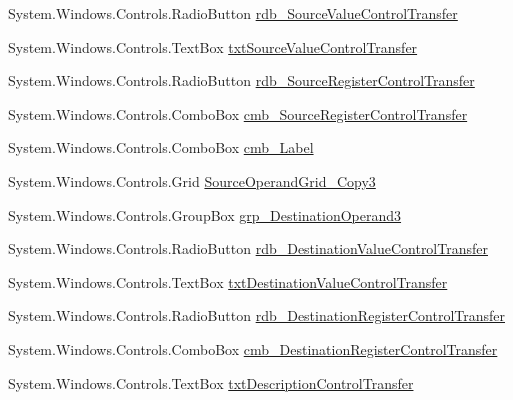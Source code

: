 \begin{DoxyCompactItemize}
\item 
System.\+Windows.\+Controls.\+Radio\+Button \hyperlink{class_c_p_u___o_s___simulator_1_1_instructions_window_a590a2e5af41ea5cf215da3ff7dd1b20b}{rdb\+\_\+\+Source\+Value\+Control\+Transfer}
\item 
System.\+Windows.\+Controls.\+Text\+Box \hyperlink{class_c_p_u___o_s___simulator_1_1_instructions_window_a602831ff353007879c08b22d373a2ba5}{txt\+Source\+Value\+Control\+Transfer}
\item 
System.\+Windows.\+Controls.\+Radio\+Button \hyperlink{class_c_p_u___o_s___simulator_1_1_instructions_window_a63fea6d97a26f4ed71753209dac85d24}{rdb\+\_\+\+Source\+Register\+Control\+Transfer}
\item 
System.\+Windows.\+Controls.\+Combo\+Box \hyperlink{class_c_p_u___o_s___simulator_1_1_instructions_window_a652354e464657693cf70a292b3389626}{cmb\+\_\+\+Source\+Register\+Control\+Transfer}
\item 
System.\+Windows.\+Controls.\+Combo\+Box \hyperlink{class_c_p_u___o_s___simulator_1_1_instructions_window_ab5cb868e415c29cd067309b9cce1efc1}{cmb\+\_\+\+Label}
\item 
System.\+Windows.\+Controls.\+Grid \hyperlink{class_c_p_u___o_s___simulator_1_1_instructions_window_ac37123264ae139f4abc30841da21cd23}{Source\+Operand\+Grid\+\_\+\+Copy3}
\item 
System.\+Windows.\+Controls.\+Group\+Box \hyperlink{class_c_p_u___o_s___simulator_1_1_instructions_window_a175eb53a0a0f48be4d8717f1e5a5942e}{grp\+\_\+\+Destination\+Operand3}
\item 
System.\+Windows.\+Controls.\+Radio\+Button \hyperlink{class_c_p_u___o_s___simulator_1_1_instructions_window_afedaca6e4102fbae9f5db622be1b839d}{rdb\+\_\+\+Destination\+Value\+Control\+Transfer}
\item 
System.\+Windows.\+Controls.\+Text\+Box \hyperlink{class_c_p_u___o_s___simulator_1_1_instructions_window_a0049dce789d892e6620158859bcf7057}{txt\+Destination\+Value\+Control\+Transfer}
\item 
System.\+Windows.\+Controls.\+Radio\+Button \hyperlink{class_c_p_u___o_s___simulator_1_1_instructions_window_a4911636b6e093aa89155a0f5db4b3118}{rdb\+\_\+\+Destination\+Register\+Control\+Transfer}
\item 
System.\+Windows.\+Controls.\+Combo\+Box \hyperlink{class_c_p_u___o_s___simulator_1_1_instructions_window_a9017d3508e5dde75eafec25e94611c97}{cmb\+\_\+\+Destination\+Register\+Control\+Transfer}
\item 
System.\+Windows.\+Controls.\+Text\+Box \hyperlink{class_c_p_u___o_s___simulator_1_1_instructions_window_af8667a9cb444eb6aaa84349fe194b853}{txt\+Description\+Control\+Transfer}

\end{DoxyCompactItemize}

